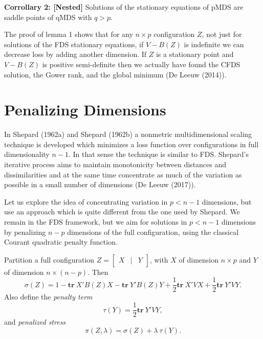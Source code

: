\documentclass[
  12pt,
]{article}
\begin{document}
\textbf{Corrollary 2: {[}Nested{]}} Solutions of the stationary
equations of pMDS are saddle points of qMDS with \(q>p\).

The proof of lemma 1 shows that for any \(n\times p\) configuration
\(Z\), not just for solutions of the FDS stationary equations, if
\(V-B(Z)\) is indefinite we can decrease loss by adding another
dimension. If \(Z\) is a stationary point and \(V-B(Z)\) is positive
semi-definite then we actually have found the CFDS solution, the Gower
rank, and the global minimum (De Leeuw (2014)).

\hypertarget{penalizing-dimensions}{%
\section{Penalizing Dimensions}\label{penalizing-dimensions}}

In Shepard (1962a) and Shepard (1962b) a nonmetric multidimensional
scaling technique is developed which minimizes a loss function over
configurations in full dimensionality \(n-1\). In that sense the
technique is similar to FDS. Shepard's iterative process aims to
maintain monotonicity between distances and dissimilarities and at the
same time concentrate as much of the variation as possible in a small
number of dimensions (De Leeuw (2017)).

Let us explore the idea of concentrating variation in \(p<n-1\)
dimensions, but use an approach which is quite different from the one
used by Shepard. We remain in the FDS framework, but we aim for
solutions in \(p<n-1\) dimensions by penalizing \(n-p\) dimensions of
the full configuration, using the classical Courant quadratic penalty
function.

Partition a full configuration
\(Z=\begin{bmatrix}X&\mid&Y\end{bmatrix}\), with \(X\) of dimension
\(n\times p\) and \(Y\) of dimension \(n\times(n-p)\). Then
\begin{equation}\label{E:part}   
\sigma(Z)=1-\mathbf{tr}\ X'B(Z)X - \mathbf{tr}\ Y'B(Z)Y+\frac12 \mathbf{tr}\ X'VX+\frac12 \mathbf{tr}\ Y'VY.
\end{equation} Also define the \emph{penalty term}
\begin{equation}\label{E:tau}
\tau(Y)=\frac12\mathbf{tr}\ Y'VY,
\end{equation} and \emph{penalized stress} \begin{equation}\label{E:pi}
\pi(Z,\lambda)=\sigma(Z)+\lambda\ \tau(Y).
\end{equation}
\end{document}
